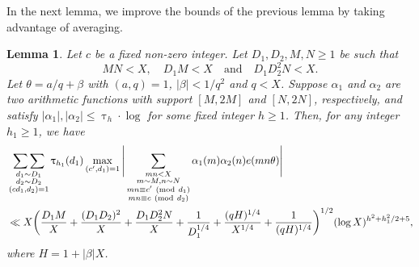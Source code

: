 \documentclass[12pt]{amsart}
\numberwithin{equation}{section}
\newtheorem{lemma}[theorem]{Lemma}
\theoremstyle{remark}
\theoremstyle{definition}
\newcommand{\imod}[1]{\ (\mathrm{mod}\ #1)}
\begin{document}
In the next lemma, we improve the bounds of the previous lemma by taking advantage of averaging.



\begin{lemma}\label{lemmatypeII}
Let $c$ be a fixed non-zero integer. Let $D_1, D_2, M, N \geq 1$ be such that
\[MN< X, \quad D_1M< X \quad  \text{and} \quad D_1D_2^{2}N< X.\]
 Let $\theta=a/q+\beta$ with $(a, q)=1$, $\lvert \beta \rvert <1/q^2$ and $q<X$. Suppose ${\alpha}_1$ and ${\alpha}_2$ are two arithmetic functions with support $[M, 2M]$ and $[N, 2N]$, respectively, and satisfy $\lvert {\alpha}_1|, |{\alpha}_2| \leq \uptau_h\cdot \log $ for some fixed integer $h\geq 1$. Then, for any integer $h_1\geq 1$, we have
\begin{align}
\notag &\mathop{\sum\sum}_{\substack{d_1\sim D_1\\d_2\sim D_2\\(cd_1,d_2)=1}}\uptau_{h_1}(d_1)\max_{(c', d_1)=1}\Bigg\lvert\sum_{\substack{mn <X\\m\sim M, n\sim N\\mn\equiv c'\imod {d_1}\\mn\equiv c\imod {d_2}}}{\alpha}_1(m){\alpha}_2(n)e(mn\theta)\Bigg\rvert\\
\notag &\ll  X\bigg(\dfrac{D_1M}{X} + \dfrac{(D_1D_2)^2}{X}+\dfrac{D_1D_2^2N}{X} + \dfrac{1}{D_1^{1/4}} + \dfrac{(qH)^{1/4}}{X^{1/4}} + \dfrac{1}{(qH)^{1/4}}\bigg)^{1/2}(\log X)^{h^2+h_1^2/2 + 5},
\end{align}
where $H=1+|\beta|X$.
\end{lemma}
\end{document}
